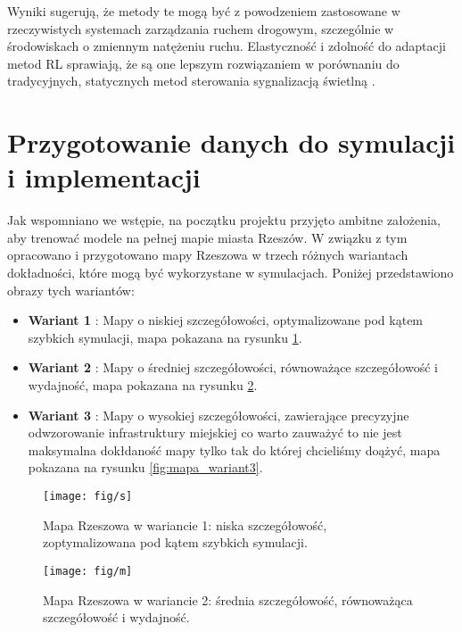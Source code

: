 \documentclass[12pt, a4paper]{article} %
\begin{document}
    Wyniki sugerują, że metody te mogą być z powodzeniem zastosowane w rzeczywistych systemach zarządzania ruchem
    drogowym, szczególnie w środowiskach o zmiennym natężeniu ruchu. Elastyczność i zdolność do adaptacji metod RL
    sprawiają, że są one lepszym rozwiązaniem w porównaniu do tradycyjnych, statycznych metod sterowania sygnalizacją
    świetlną \cite{Louw2022}.


    \section{Przygotowanie danych do symulacji i implementacji}

    Jak wspomniano we wstępie, na początku projektu przyjęto ambitne założenia, aby trenować modele na pełnej mapie
    miasta Rzeszów. W związku z tym opracowano i przygotowano mapy Rzeszowa w trzech różnych wariantach dokładności,
    które mogą być wykorzystane w symulacjach. Poniżej przedstawiono obrazy tych wariantów:

    \begin{itemize}
        \item \textbf{Wariant 1}
        : Mapy o niskiej szczegółowości, optymalizowane pod kątem szybkich symulacji, mapa pokazana na rysunku
        \ref{fig:mapa_wariant1}.
        \item \textbf{Wariant 2}
        : Mapy o średniej szczegółowości, równoważące szczegółowość i wydajność, mapa pokazana na rysunku
        \ref{fig:mapa_wariant2}.
        \item \textbf{Wariant 3}
        : Mapy o wysokiej szczegółowości, zawierające precyzyjne odwzorowanie infrastruktury miejskiej co warto zauważyć
        to nie jest maksymalna dokłdaność mapy tylko tak do której chcieliśmy doążyć, mapa pokazana na
        rysunku \ref{fig:mapa_wariant3}.
    \end{itemize}

    \begin{figure}[!h]
        \centering
        \texttt{[image: fig/s]}
        \caption{Mapa Rzeszowa w wariancie 1: niska szczegółowość, zoptymalizowana pod kątem szybkich symulacji.}
        \label{fig:mapa_wariant1}
    \end{figure}

    \begin{figure}[!h]
        \centering
        \texttt{[image: fig/m]}
        \caption{Mapa Rzeszowa w wariancie 2: średnia szczegółowość, równoważąca szczegółowość i wydajność.}
        \label{fig:mapa_wariant2}
    \end{figure}
\end{document}
